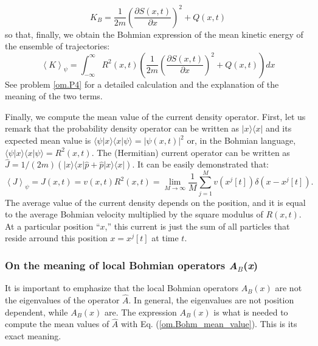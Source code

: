 \documentclass[onecolumn,nofootinbib, secnumarabic, amsmath, nobibnotes,12pt,aps,pra]{revtex4-1}
\newcommand{\ket}[1]{\ensuremath{|#1\rangle}}
\newcommand{\bra}[1]{\ensuremath{\langle#1|}}
\newcommand{\braket}[2]{\langle#1|#2\rangle}
\newcommand{\eref}[1]{Eq. (\ref{#1})}
\newcommand{\abs}[1]{\left| #1 \right|} %
\newcommand{\avg}[1]{\left\langle #1 \right\rangle} %
\begin{document}
\begin{equation}
\label{om.local_kinetic_energy_mean_B_bis}
K_B = \frac {1} {2m}\left(\frac {\partial S(x,t)} {\partial x} \right)^2 + Q(x,t)
\end{equation}
so that, finally, we obtain the Bohmian expression of the mean kinetic energy of the ensemble of trajectories:
\begin{equation}
\label{om.kinetic_energy_mean_B}
\avg{K}_{\psi} = \int_{-\infty}^{\infty} R^2(x,t) \left( \frac {1} {2m} \left(\frac {\partial S(x,t)} {\partial x} \right)^2 + Q(x,t)\right) dx
\end{equation}
See problem \ref{om.P4} for a detailed calculation and the explanation of the meaning of the two terms.

Finally, we compute the mean value of the current density operator. First, let us remark that the probability density operator can be written as $\ket{x}\bra{x}$ and its expected mean value is $\braket{\psi}{x} \braket{x}{\psi} = \abs{\psi(x,t)}^2$ or, in the Bohmian language, $\braket{\psi}{x} \braket{x}{\psi} = R^2(x,t)$. The (Hermitian) current operator can be written as $\hat{J} = 1/(2m) (\ket{x}\bra{x}\hat{p} + \hat{p}\ket{x}\bra{x})$. It can be easily demonstrated that:
\begin{equation}
\avg{J}_{\psi}=J(x,t)=v(x,t) R^2(x,t)=\lim_{M\rightarrow\infty} \frac {1} {M} \sum_{j=1}^{M} v(x^j[t]) \delta(x-x^j[t]).
\end{equation}
The average value of the current density depends on the position,
and it is equal to the average Bohmian velocity multiplied by the
square modulus of $R(x,t)$. At a particular position ``$x$,'' this
current is just the sum of all particles that reside arround this
position $x = x^j[t]$ at time $t$.

\subsubsection{On the meaning of local Bohmian operators \textit{A}$_\textit{B}$(\textit{x})}

It is important to emphasize that the local Bohmian operators
$A_B(x)$ are not the eigenvalues of the operator $\hat{A}$. In
general, the eigenvalues are not position dependent, while $A_B(x)$
are. The expression $A_B(x)$ is what is needed to compute the mean
values of $\hat{A}$ with \eref{om.Bohm_mean_value}. This is its
exact meaning.
\end{document}
